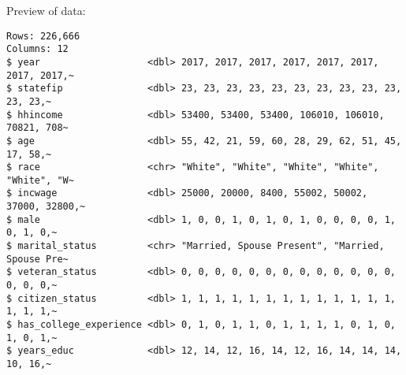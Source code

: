 \documentclass[12pt]{article}
\begin{document}
\newpage

Preview of data:

\begin{verbatim}
Rows: 226,666
Columns: 12
$ year                   <dbl> 2017, 2017, 2017, 2017, 2017, 2017, 2017, 2017,~
$ statefip               <dbl> 23, 23, 23, 23, 23, 23, 23, 23, 23, 23, 23, 23,~
$ hhincome               <dbl> 53400, 53400, 53400, 106010, 106010, 70821, 708~
$ age                    <dbl> 55, 42, 21, 59, 60, 28, 29, 62, 51, 45, 17, 58,~
$ race                   <chr> "White", "White", "White", "White", "White", "W~
$ incwage                <dbl> 25000, 20000, 8400, 55002, 50002, 37000, 32800,~
$ male                   <dbl> 1, 0, 0, 1, 0, 1, 0, 1, 0, 0, 0, 0, 1, 0, 1, 0,~
$ marital_status         <chr> "Married, Spouse Present", "Married, Spouse Pre~
$ veteran_status         <dbl> 0, 0, 0, 0, 0, 0, 0, 0, 0, 0, 0, 0, 0, 0, 0, 0,~
$ citizen_status         <dbl> 1, 1, 1, 1, 1, 1, 1, 1, 1, 1, 1, 1, 1, 1, 1, 1,~
$ has_college_experience <dbl> 0, 1, 0, 1, 1, 0, 1, 1, 1, 1, 0, 1, 0, 1, 0, 1,~
$ years_educ             <dbl> 12, 14, 12, 16, 14, 12, 16, 14, 14, 14, 10, 16,~
\end{verbatim}
\end{document}
